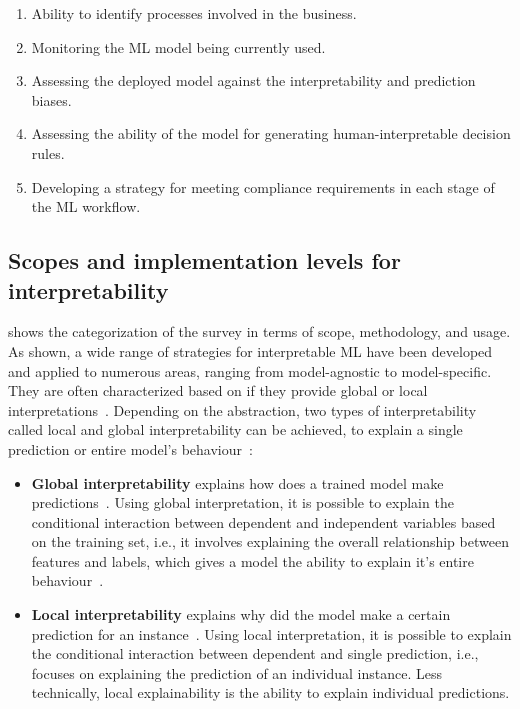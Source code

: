 \begin{enumerate}[noitemsep]
    \item Ability to identify processes involved in the business.
    \item Monitoring the ML model being currently used.
    \item Assessing the deployed model against the interpretability and prediction biases. 
    \item Assessing the ability of the model for generating human-interpretable decision rules. 
    \item Developing a strategy for meeting compliance requirements in each stage of the ML workflow.  
\end{enumerate}

\subsection{Scopes and implementation levels for interpretability}
 shows the categorization of the survey in terms of scope, methodology, and usage. As shown, a wide range of strategies for interpretable ML have been developed and applied to numerous areas, ranging from model-agnostic to model-specific. They are often characterized based on if they provide global or local interpretations~\cite{azodi2020opening}. Depending on the abstraction, two types of interpretability called local and global interpretability can be achieved, to explain a single prediction or entire model's behaviour~\cite{molnar2019interpretable}: 

\begin{itemize}[noitemsep]
    \item \textbf{Global interpretability} explains how does a trained model make predictions~\cite{molnar2019interpretable}. Using global interpretation, it is possible to explain the conditional interaction between dependent and independent variables based on the training set, i.e., it involves explaining the overall relationship between features and labels, which gives a model the ability to explain it's entire behaviour~\cite{molnar2019interpretable}. 
    \item \textbf{Local interpretability} explains why did the model make a certain prediction for an instance~\cite{molnar2019interpretable}. Using local interpretation, it is possible to explain the conditional interaction between dependent and single prediction, i.e., focuses on explaining the prediction of an individual instance. Less technically, local explainability is the ability to explain individual predictions.  
\end{itemize}

